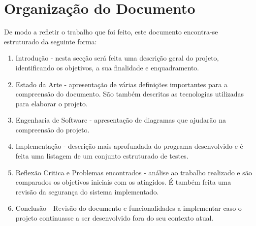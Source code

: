 \section{Organização do Documento}
\label{sec:organ}

De modo a refletir o trabalho que foi feito, este documento encontra-se estruturado da seguinte forma:
\begin{enumerate}
    \item Introdução - nesta secção será feita  uma descrição geral do projeto, identificando os objetivos, a sua finalidade e enquadramento.
    \item Estado da Arte - apresentação de várias definições importantes para a compreensão do documento. São também descritas as tecnologias utilizadas para elaborar o projeto.
    \item Engenharia de Software - apresentação de diagramas que ajudarão na compreensão do projeto.
    \item Implementação - descrição mais aprofundada do programa desenvolvido e é feita uma listagem de um conjunto estruturado de testes.
    \item Reflexão Critica e Problemas encontrados - análise ao trabalho realizado e são comparados os objetivos iniciais com os atingidos. É também feita uma revisão da segurança do sistema implementado.
    \item Conclusão - Revisão do documento e funcionalidades a implementar caso o projeto continuasse a ser desenvolvido fora do seu contexto atual.
\end{enumerate}
